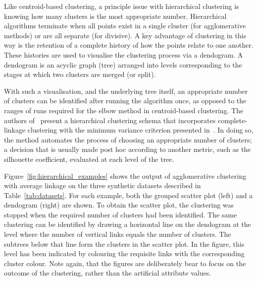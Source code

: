 Like centroid-based clustering, a principle issue with hierarchical clustering
is knowing how many clusters is the most appropriate number. Hierarchical
algorithms terminate when all points exist in a single cluster (for
agglomerative methods) or are all separate (for divisive). A key advantage of
clustering in this way is the retention of a complete history of how the points
relate to one another. These histories are used to visualise the clustering
process via a dendogram. A dendogram is an acyclic graph (tree) arranged into
levels corresponding to the stages at which two clusters are merged (or split).

With such a visualisation, and the underlying tree itself, an appropriate number
of clusters can be identified after running the algorithm once, as opposed to
the ranges of runs required for the elbow method in centroid-based clustering.
The authors of~\cite{Tellaroli2016} present a hierarchical clustering schema
that incorporates complete-linkage clustering with the minimum variance
criterion presented in~\cite{Ward1963}. In doing so, the method automates the
process of choosing an appropriate number of clusters; a decision that is
usually made post hoc according to another metric, such as the silhouette
coefficient, evaluated at each level of the tree.

Figure~\ref{fig:hierarchical_examples} shows the output of agglomerative
clustering with average linkage on the three synthetic datasets described in
Table~\ref{tab:datasets}. For each example, both the grouped scatter plot (left)
and a dendogram (right) are shown. To obtain the scatter plot, the clustering
was stopped when the required number of clusters had been identified. The same
clustering can be identified by drawing a horizontal line on the dendogram at
the level where the number of vertical links equals the number of clusters. The
subtrees below that line form the clusters in the scatter plot. In the figure,
this level has been indicated by colouring the requisite links with the
corresponding cluster colour. Note again, that the figures are deliberately bear
to focus on the outcome of the clustering, rather than the artificial attribute
values.

